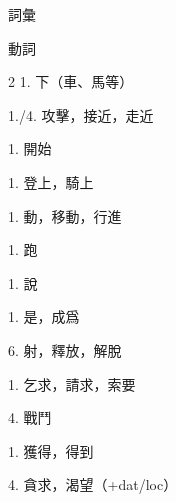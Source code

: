 \documentclass[aspectratio=169]{beamer}
\begin{document}
\begin{frame}{詞彙}
    \begin{block}{動詞}
        \begin{VocabCols}{2}
             1.  下（車、馬等）
            
             1./4.  攻擊，接近，走近
            
             1.  開始
            
             1.  登上，騎上
            
             1.  動，移動，行進
            
             1.  跑
            
             1.  說
            
             1.  是，成爲
            
             6.  射，釋放，解脫
            
             1.  乞求，請求，索要
            
             4.  戰鬥
            
             1.  獲得，得到
            
             4.  貪求，渴望（+dat/loc）
        \end{VocabCols}
    \end{block}
\end{frame}
\end{document}
